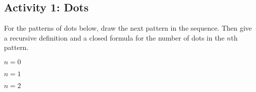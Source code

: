 \documentclass[11pt]{exam}
\def\v{circle (3pt)}
\begin{document}

\subsection*{Activity 1: Dots}

For the patterns of dots below, draw the next pattern in the sequence.  Then give a recursive definition and a closed formula for the number of dots in the $n$th pattern. 


  \begin{multicols}{4}
  \begin{center}
  
  $n = 0$
  \end{center}
  
  \columnbreak
    \begin{center}
    
    $n = 1$
    \end{center}
    
    \columnbreak
    
    \begin{center}
    
    $n = 2$
    \end{center}
    
    \columnbreak

	~
  \end{multicols}
  
\vfill
\end{document}
